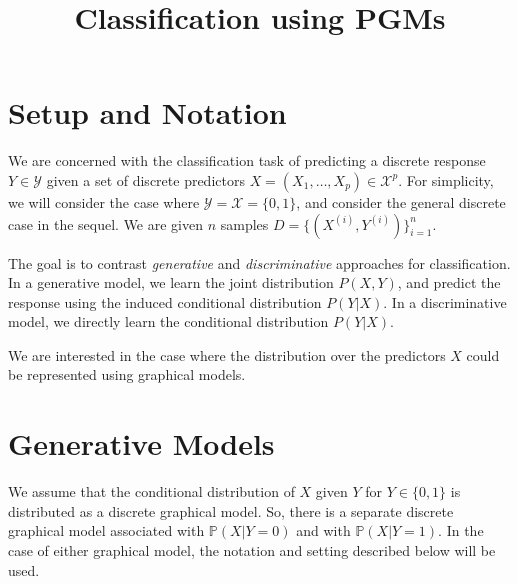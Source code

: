 \documentclass{article}
\title{Classification using PGMs}
\date{}
\def\mprob{\mathbb{P}}
\begin{document}
\maketitle

\section{Setup and Notation}

We are concerned with the classification task of predicting  a discrete response $Y \in \mathcal{Y}$ given a set of 
discrete predictors $X = (X_1,\hdots,X_p) \in \mathcal{X}^p$. For simplicity, we will consider the case where $\mathcal{Y} = \mathcal{X} = \{0,1\}$,
and consider the general discrete case in the sequel. We are given $n$ samples $D = \{(X^{(i)}, Y^{(i)})\}_{i=1}^{n}$. 

The goal is to contrast \emph{generative} and \emph{discriminative} approaches for classification. In a generative model, we learn the joint distribution $P(X,Y)$, and predict
the response using the induced conditional distribution $P(Y|X)$. In a discriminative model, we directly learn the conditional distribution $P(Y|X)$.

We are interested in the case where the distribution over the predictors $X$ could be represented using graphical models.


\section{Generative Models}
\label{Sec:GenerativeModel}
We assume that the conditional distribution of $X$ given $Y$ for $Y \in \{0,1\}$ is distributed as a discrete graphical model. So, there is a separate discrete graphical model associated with $\mprob(X|Y=0)$ and with $\mprob(X|Y=1)$. In the case of either graphical model, the notation and setting described below will be used.
\end{document}
